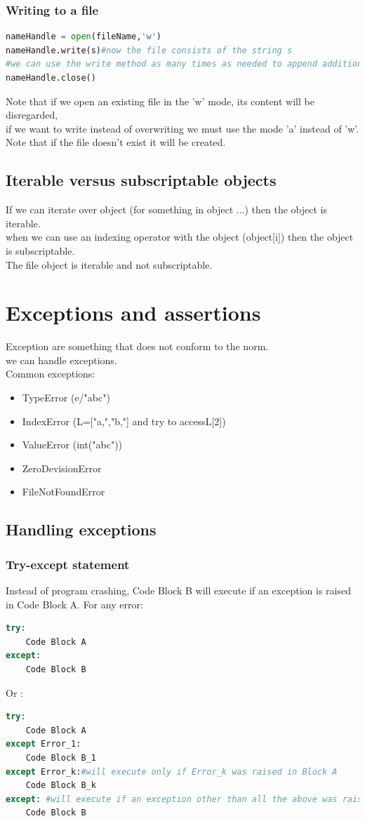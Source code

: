 \documentclass[12pt,oneside]{book}
\begin{document}
\subsubsection{Writing to a file}
{\small\begin{lstlisting}[language=python]
nameHandle = open(fileName,'w')
nameHandle.write(s)#now the file consists of the string s
#we can use the write method as many times as needed to append additional strings 
nameHandle.close()
\end{lstlisting}}
Note that if we open an existing file in the 'w' mode, its content will be disregarded,\\
if we want to write instead of overwriting we must use the mode 'a' instead of 'w'. \\
Note that if the file doesn't exist it will be created.\\
\subsection{Iterable versus subscriptable objects}
If we can iterate over object (for something in object ...) then the object is iterable.\\
when we can use an indexing operator with the object (object[i]) then the object is subscriptable.\\
The file object is iterable and not subscriptable.
\section{Exceptions and assertions}
Exception are something that does not conform to the norm.\\
we can handle exceptions.\\
Common exceptions:
\begin{itemize}
	\item TypeError (e/"abc")
	\item IndexError (L=["a,","b,"] and try to accessL[2])
	\item ValueError (int("abc"))
	\item ZeroDevisionError
	\item FileNotFoundError
\end{itemize}
\subsection{Handling exceptions}
\subsubsection{Try-except statement}
Instead of program crashing, Code Block B will execute if an exception is raised in Code Block A.
For any error:
{\small\begin{lstlisting}[language=python]
try:
	Code Block A 
except:
	Code Block B 
\end{lstlisting}}
Or :
{\small\begin{lstlisting}[language=python]
try: 
	Code Block A 
except Error_1:
	Code Block B_1
except Error_k:#will execute only if Error_k was raised in Block A
	Code Block B_k 
except: #will execute if an exception other than all the above was raised in Block A
	Code Block B
\end{lstlisting}}
\end{document}

